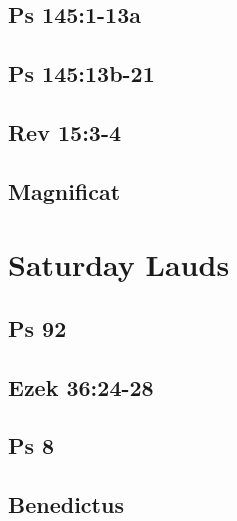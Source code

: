 \subsection{Ps 145:1-13a}

\subsection{Ps 145:13b-21}

\subsection{Rev 15:3-4}

\subsection{Magnificat}


\section{Saturday Lauds}

\subsection{Ps 92}

\subsection{Ezek 36:24-28}

\subsection{Ps 8}

\subsection{Benedictus}
